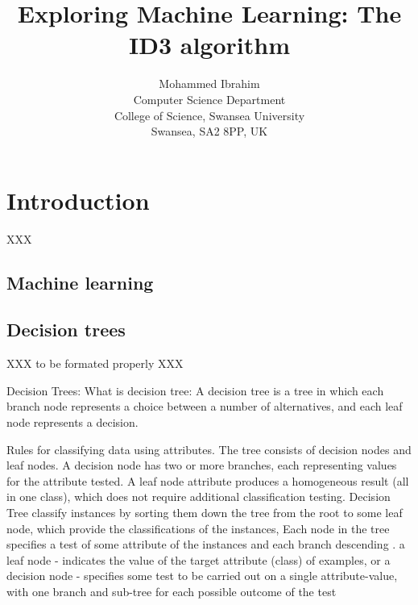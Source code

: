 \documentclass{article}
\begin{document}
\title{Exploring Machine Learning: The ID3 algorithm}

\author{Mohammed Ibrahim\\
 Computer Science Department\\
  College of Science, Swansea University\\
  Swansea, SA2 8PP, UK
}

\maketitle

\tableofcontents

\section{Introduction}
\label{sec:int}

XXX

\subsection{Machine learning}
\label{sec:machinelearn}


\subsection{Decision trees}
\label{sec:dectree}

XXX to be formated properly XXX

Decision Trees:
What is decision tree: A decision tree is a tree in which each branch node represents a choice between a number of alternatives, and each leaf node represents a decision.

Rules for classifying data using attributes.
The tree consists of decision nodes and leaf nodes.
A decision node has two or more branches, each representing values for the attribute tested.
A leaf node attribute produces a homogeneous result (all in one class), which does not require additional classification testing.
Decision Tree classify instances by sorting them down the tree from the root to some leaf node, which provide the classifications of the instances, Each node in the tree specifies a test of some attribute of the instances and each branch descending .
a leaf node - indicates the value of the target attribute (class) of examples, or  a decision node - specifies some test to be carried out on a single attribute-value, with one branch and sub-tree for each possible outcome of the test
\end{document}
